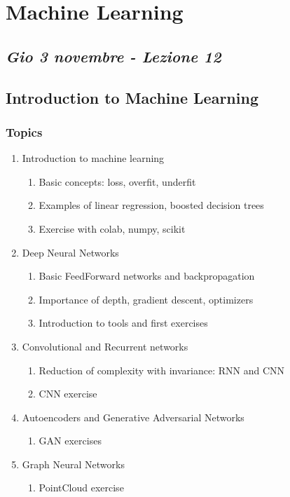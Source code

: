 \chapter{Machine Learning}

\section{\textit{Gio 3 novembre - Lezione 12}}
\section{Introduction to Machine Learning}

\subsection{Topics}

\begin{enumerate}
	\item Introduction to machine learning
	\begin{enumerate}
		\item Basic concepts: loss, overfit, underfit
		\item Examples of linear regression, boosted decision trees
		\item Exercise with colab, numpy, scikit
	\end{enumerate}
	\item Deep Neural Networks
	\begin{enumerate}
		\item Basic FeedForward networks and backpropagation
		\item Importance of depth, gradient descent, optimizers
		\item Introduction to tools and first exercises
	\end{enumerate}
	\item Convolutional and Recurrent networks
	\begin{enumerate}
		\item Reduction of complexity with invariance: RNN and CNN
		\item CNN exercise
	\end{enumerate}
	\item Autoencoders and Generative Adversarial Networks
	\begin{enumerate}
		\item GAN exercises
	\end{enumerate}
	\item Graph Neural Networks
	\begin{enumerate}
		\item PointCloud exercise
	\end{enumerate}
\end{enumerate}

